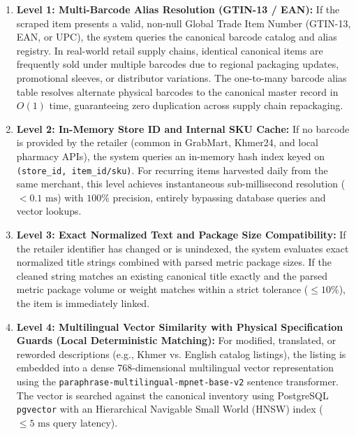 \begin{enumerate}
    \item \textbf{Level 1: Multi-Barcode Alias Resolution (GTIN-13 / EAN):}
    If the scraped item presents a valid, non-null Global Trade Item Number (GTIN-13, EAN, or UPC), the system queries the canonical barcode catalog and alias registry. In real-world retail supply chains, identical canonical items are frequently sold under multiple barcodes due to regional packaging updates, promotional sleeves, or distributor variations. The one-to-many barcode alias table resolves alternate physical barcodes to the canonical master record in $O(1)$ time, guaranteeing zero duplication across supply chain repackaging.

    \item \textbf{Level 2: In-Memory Store ID and Internal SKU Cache:}
    If no barcode is provided by the retailer (common in GrabMart, Khmer24, and local pharmacy APIs), the system queries an in-memory hash index keyed on \texttt{(store\_id, item\_id/sku)}. For recurring items harvested daily from the same merchant, this level achieves instantaneous sub-millisecond resolution ($< 0.1\text{ ms}$) with $100\%$ precision, entirely bypassing database queries and vector lookups.

    \item \textbf{Level 3: Exact Normalized Text and Package Size Compatibility:}
    If the retailer identifier has changed or is unindexed, the system evaluates exact normalized title strings combined with parsed metric package sizes. If the cleaned string matches an existing canonical title exactly and the parsed metric package volume or weight matches within a strict tolerance ($\le 10\%$), the item is immediately linked.

    \item \textbf{Level 4: Multilingual Vector Similarity with Physical Specification Guards (Local Deterministic Matching):}
    For modified, translated, or reworded descriptions (e.g., Khmer vs. English catalog listings), the listing is embedded into a dense 768-dimensional multilingual vector representation using the \texttt{paraphrase-multilingual-mpnet-base-v2} sentence transformer. The vector is searched against the canonical inventory using PostgreSQL \texttt{pgvector} with an Hierarchical Navigable Small World (HNSW) index ($\le 5\text{ ms}$ query latency).
    

\end{enumerate}
